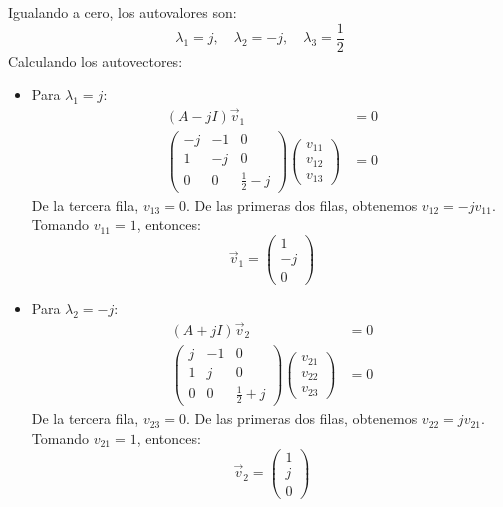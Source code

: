 \documentclass[
  11pt,
  letterpaper,
   addpoints,
   answers
  ]{exam}
\begin{document}
\begin{questions}
\begin{solution}
Igualando a cero, los autovalores son:
\begin{equation}
  \lambda_1 = j, \quad \lambda_2 = -j, \quad \lambda_3 = \frac{1}{2}
\end{equation}
Calculando los autovectores:
\begin{itemize}
  \item Para $\lambda_1 = j$:
  \begin{align}
    (A - jI)\vec{v}_1 &= 0 \\
    \begin{pmatrix} -j & -1 & 0 \\ 1 & -j & 0 \\ 0 & 0 & \frac{1}{2} - j \end{pmatrix} \begin{pmatrix} v_{11} \\ v_{12} \\ v_{13} \end{pmatrix} &= 0
  \end{align}
  De la tercera fila, $v_{13} = 0$. De las primeras dos filas, obtenemos $v_{12} = -j v_{11}$. Tomando $v_{11} = 1$, entonces:
  \begin{equation}
    \vec{v}_1 = \begin{pmatrix} 1 \\ -j \\ 0 \end{pmatrix}
  \end{equation}

  \item Para $\lambda_2 = -j$:
  \begin{align}
    (A + jI)\vec{v}_2 &= 0 \\
    \begin{pmatrix} j & -1 & 0 \\ 1 & j & 0 \\ 0 & 0 & \frac{1}{2} + j \end{pmatrix} \begin{pmatrix} v_{21} \\ v_{22} \\ v_{23} \end{pmatrix} &= 0
  \end{align}
  De la tercera fila, $v_{23} = 0$. De las primeras dos filas, obtenemos $v_{22} = j v_{21}$. Tomando $v_{21} = 1$, entonces:
  \begin{equation}
    \vec{v}_2 = \begin{pmatrix} 1 \\ j \\ 0 \end{pmatrix}
  \end{equation}


\end{itemize}
\end{solution}
\end{questions}
\end{document}
